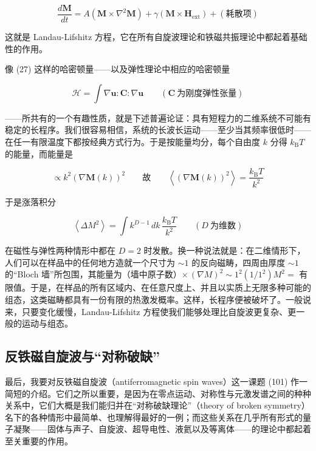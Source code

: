 \begin{equation*}
\frac{d\mathbf{M}}{dt} = A\left(\mathbf{M}\times\nabla^{2}\mathbf{M}\right) + \gamma\left(\mathbf{M}\times\mathbf{H}_{\mathrm{ext}}\right) + \left(\text{耗散项}\right)
\end{equation*}

这就是 Landau-Lifshitz 方程，它在所有自旋波理论和铁磁共振理论中都起着基础性的作用。

像 (27) 这样的哈密顿量——以及弹性理论中相应的哈密顿量

\begin{equation*}
\mathcal{H} = \int \nabla\mathbf{u}:\mathbf{C}:\nabla\mathbf{u} \qquad \left(\mathbf{C}\ \text{为刚度弹性张量}\right)
\end{equation*}

——所共有的一个有趣性质，就是下述普遍论证：具有短程力的二维系统不可能有稳定的长程序。我们很容易相信，系统的长波长运动——至少当其频率很低时——在任一有限温度下都按经典方式行为。于是按能量均分，每个自由度 $k$ 分得 $k_{\mathrm{B}}T$ 的能量，而能量是

\begin{equation*}
\propto k^{2}\left(\nabla\mathbf{M}(k)\right)^{2} \qquad \text{故} \qquad \left\langle\left(\nabla\mathbf{M}(k)\right)^{2}\right\rangle = \frac{k_{\mathrm{B}}T}{k^{2}}
\end{equation*}

于是涨落积分

\begin{equation*}
\left\langle\Delta M^{2}\right\rangle = \int k^{D-1}\,dk\,\frac{k_{\mathrm{B}}T}{k^{2}} \qquad \left(D\ \text{为维数}\right)
\end{equation*}

在磁性与弹性两种情形中都在 $D = 2$ 时发散。换一种说法就是：在二维情形下，人们可以在样品中的任何地方造就一个尺寸为 $\sim 1$ 的反向磁畴，四周由厚度 $\sim 1$ 的“Bloch 墙”所包围，其能量为（墙中原子数）$\times\,(\nabla M)^2 \sim 1^2(1/1^2)M^2 =$ 有限值。于是，在样品的所有区域内、在任意尺度上、并且以实质上无限多种可能的组态，这类磁畴都具有一份有限的热激发概率。这样，长程序便被破坏了。一般说来，只要变化缓慢，Landau-Lifshitz 方程使我们能够处理比自旋波更复杂、更一般的运动与组态。

\subsection{反铁磁自旋波与“对称破缺”}

最后，我要对反铁磁自旋波（antiferromagnetic spin waves）这一课题 (101) 作一简短的介绍。它们之所以重要，是因为在零点运动、对称性与元激发谱之间的种种关系中，它们大概是我们能归并在“对称破缺理论”（theory of broken symmetry）名下的各种情形中最简单、也理解得最好的一例；而这些关系在几乎所有形式的量子凝聚——固体与声子、自旋波、超导电性、液氦以及等离体——的理论中都起着至关重要的作用。

